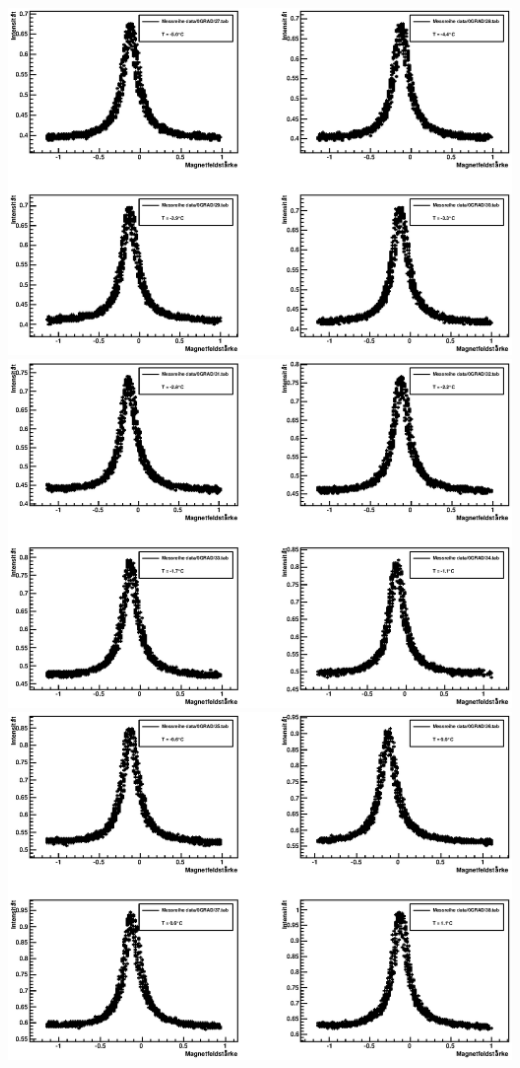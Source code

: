 \documentclass[12pt]{article}
\begin{document}
\includegraphics[width=1\linewidth]{pictures/12.eps} \\
\includegraphics[width=1\linewidth]{pictures/13.eps} \\
\includegraphics[width=1\linewidth]{pictures/14.eps} \\
\end{document}
